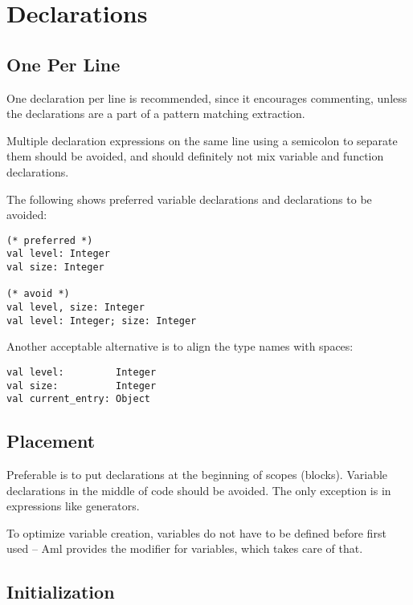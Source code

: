 \section{Declarations}






\subsection{One Per Line}

One declaration per line is recommended, since it encourages commenting, unless the declarations are a part of a pattern matching extraction. 

Multiple declaration expressions on the same line using a semicolon to separate them should be avoided, and should definitely not mix variable and function declarations. 

\example The following shows preferred variable declarations and declarations to be avoided:
\begin{lstlisting}
(* preferred *)
val level: Integer
val size: Integer

(* avoid *)
val level, size: Integer
val level: Integer; size: Integer
\end{lstlisting}

\example Another acceptable alternative is to align the type names with spaces: 
\begin{lstlisting}
val level:         Integer
val size:          Integer
val current_entry: Object
\end{lstlisting}





\subsection{Placement}

Preferable is to put declarations at the beginning of scopes (blocks). Variable declarations in the middle of code should be avoided. The only exception is in expressions like generators. 

To optimize variable creation, variables do not have to be defined before first used -- Aml provides the  modifier for variables, which takes care of that. 





\subsection{Initialization}

